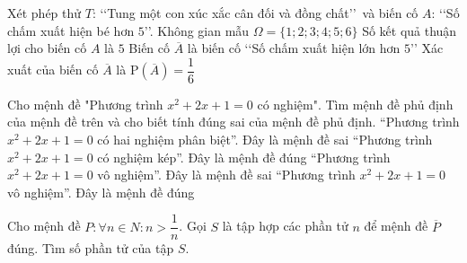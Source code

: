 \begin{ex}%
	Xét phép thử $T$: \lq\lq Tung một con xúc xắc cân đối và đồng chất\rq\rq\, và biến cố $A$: \lq\lq Số  chấm xuất hiện bé hơn $5$\rq\rq.
	\choiceTF 
		{\True  Không gian mẫu $\Omega=\{1;2;3;4;5;6\}$}
		{Số kết quả thuận lợi cho  biến cố $A$ là $5$}
		{Biến cố $\overline{A}$ là biến cố \lq\lq Số chấm  xuất hiện lớn hơn $5$\rq\rq}
		 {Xác xuất của biến cố $\overline{A}$ là $\mathrm{P}(\overline{A})=\dfrac{1}{6}$}
\end{ex}

\begin{ex}%
	 Cho mệnh đề "Phương trình $x^2+2x+1=0$ có nghiệm". Tìm mệnh đề phủ định của mệnh đề trên và cho biết tính đúng sai của mệnh đề phủ định.
	\choice 
		{``Phương trình $x^2+2x+1=0$ có hai nghiệm phân  biệt''. Đây là mệnh đề sai}
		{``Phương trình $x^2+2x+1=0$ có  nghiệm kép''. Đây là mệnh đề đúng}
		{\True  ``Phương trình $x^2+2x+1=0$ vô nghiệm''. Đây là mệnh đề sai}
		{``Phương trình $x^2+2x+1=0$ vô nghiệm''. Đây  là mệnh đề đúng}
\end{ex}

\begin{bt}%
	Cho mệnh đề  $P: \forall n\in N: n > \dfrac{1}{n}$. Gọi $S$ là tập hợp các phần tử $n$ để mệnh đề $\overline{P}$ đúng. Tìm số phần tử của tập $S$.
\end{bt}

